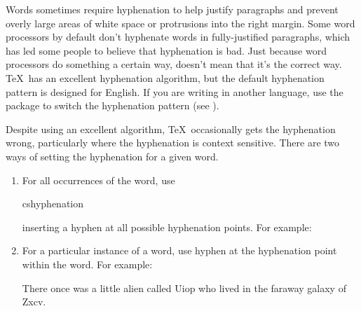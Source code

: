 Words sometimes require \gls*{hyphenation} to help justify paragraphs
and prevent overly large areas of white space or protrusions into
the right margin. Some word processors by default don't hyphenate
words in fully-justified paragraphs, which has led some people to
believe that hyphenation is bad. Just because word processors do
something a certain way, doesn't mean that it's the correct way.
\TeX\ has an excellent hyphenation algorithm, but the default
hyphenation pattern is designed for English. If you are writing in
another language, use the  package to switch the
hyphenation pattern (see ).

Despite using an excellent algorithm, \TeX\ occasionally gets the
hyphenation wrong, particularly where the hyphenation is context
sensitive. There are two ways of setting the hyphenation for a given
word.

\begin{enumerate}
\item For all occurrences of the word, use
\begin{definition}
\gls{cshyphenation}
\end{definition}
inserting a hyphen \Indextt{-} at all possible hyphenation
points. For example:
\begin{codeS}
\end{codeS}

\item For a particular instance of a word, use \gls{hyphen} at the
hyphenation point within the word. For example:
\begin{code}
There once was a little alien called Uiop who lived in the faraway galaxy of
Zxcv.
\end{code} 
\end{enumerate}
